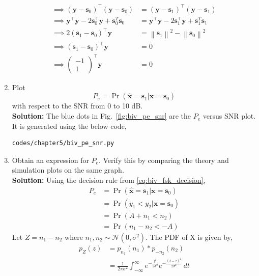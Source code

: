 \documentclass[journal,10pt,twocolumn]{IEEEtran}
\newcommand\figref{Fig.~\ref}
\providecommand{\mbf}{\mathbf}
\providecommand{\pr}[1]{\ensuremath{\Pr\left(#1\right)}}
\providecommand{\brak}[1]{\ensuremath{\left(#1\right)}}
\providecommand{\norm}[1]{\left\lVert#1\right\rVert}
\newcommand{\solution}{\noindent \textbf{Solution: }}
\newcommand{\myvec}[1]{\ensuremath{\begin{pmatrix}#1\end{pmatrix}}}
\providecommand{\gauss}[2]{\mathcal{N}\ensuremath{\left(#1,#2\right)}}
\let\vec\mathbf
\begin{document}
\begin{enumerate}
\begin{align*}
	\implies \brak{\vec{y}-\vec{s}_0}^\top \brak{\vec{y}-\vec{s}_0} &= \brak{\vec{y}-\vec{s}_1}^\top \brak{\vec{y}-\vec{s}_1}\\
	\implies \vec{y}^\top\vec{y} - 2\vec{s}_0^\top \vec{y} + \vec{s}_0^T\vec{s}_0 &= \vec{y}^\top\vec{y} - 2\vec{s}_1^\top \vec{y} + \vec{s}_1^T\vec{s}_1\\
	\implies 2\brak{\vec{s}_1-\vec{s}_0}^\top \vec{y} &= \norm{\vec{s}_1}^2 - \norm{\vec{s}_0}^2\\
	\implies \brak{\vec{s}_1-\vec{s}_0}^\top \vec{y} &= 0\\
	\implies \myvec{-1\\1}^\top \vec{y} &= 0
\end{align*}
%
\item
Plot 
\begin{equation} 
P_e = \pr{\hat{\mbf{x}} = \mbf{s}_1|\mbf{x} = \mbf{s}_0}
\label{eq:prob_error_fsk}
\end{equation}
with respect to the SNR from 0 to 10 dB.\\
\solution The blue dots in \figref{fig:biv_pe_snr} are the $P_e$ versus SNR plot. It is generated using the below code,
\begin{lstlisting}
codes/chapter5/biv_pe_snr.py
\end{lstlisting}
%
\item
Obtain an expression for $P_e$. Verify this by comparing the theory and simulation plots on the same graph.\\
\solution Using the decision rule from \eqref{eq:biv_fsk_decision},
\begin{align}
	\nonumber
	P_e &= \pr{\hat{\mbf{x}} = \mbf{s}_1|\mbf{x} = \mbf{s}_0}\\\nonumber
	&= \pr{y_1 < y_2|\mbf{x} = \mbf{s}_0}\\\nonumber
	&= \pr{A+n_1 < n_2}\\
	\label{eq:prob_error_fsk_inter}
	&= \pr{n_1-n_2 < -A}
\end{align}
Let $Z = n_1-n_2$ where $n_1, n_2 \sim \gauss{0}{\sigma^2}$. The PDF of X is given by,
\begin{align}
	\nonumber
	p_Z(z) &= p_{n_1}(n_1) \ast p_{-n_2}(n_2)\\\nonumber
	&= \frac{1}{2\pi\sigma^2}\int_{-\infty}^{\infty} e^{-\frac{t^2}{2\sigma^2}}e^{-\frac{(t-z)^2}{2\sigma^2}}  \,dt\\\nonumber

\end{align}
\end{enumerate}
\end{document}

